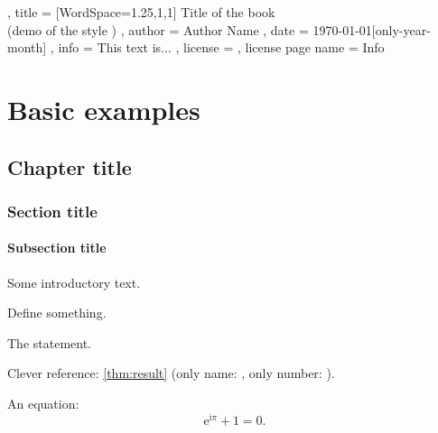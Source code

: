 \documentclass[a4paper, 11pt,
  use style = plain,
  title in boldface,
  theorem in new line,
  emphasize theorems,
  theorem numbering = section,
  simple name,  %
  name in link, %
]{simplivre}
\numberwithin{equation}{section}
\begin{document}
\frontmatter

\TitlePage
  {
    , title     = { [WordSpace={1.25,1,1}]
                    Title of the book\\(demo of the style )
                  }
    , author    = { Author Name }
    , date      = { \today[only-year-month] }
    , info      = {
                    This text is... \blindtext
                  }
    , license   = {  \medskip\doclicenseThis }
    , license page name = { Info }
  }

\tableofcontents

\mainmatter

\mainmatter

\part{Basic examples}

\chapter{Chapter title}

\section{Section title}

\subsection{Subsection title}

Some introductory text.

\begin{definition}[something]
  Define something.
\end{definition}

\begin{theorem}\label{thm:result}
  The statement.
\end{theorem}

\begin{emphasis}
  Clever reference: \cref{thm:result} (only name: , only number: ).
\end{emphasis}

An equation:
\begin{equation}\label{eq:Euler}
  \mathrm{e}^{\mathrm{i}\pi} + 1 = 0.
\end{equation}
\end{document}
